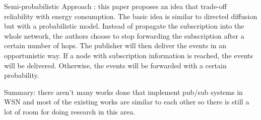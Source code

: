Semi-probabilistic Approach \cite{sp}: this paper proposes an idea that trade-off reliability with energy consumption. The basic idea is similar to directed diffusion but with a probabilistic model. Instead of propagate the subscription into the whole network, the authors choose to stop forwarding the subscription after a certain number of hops. The publisher will then deliver the events in an opportunistic way. If a node with subscription information is reached, the events will be delivered. Otherwise, the events will be forwarded with a certain probability.

Summary: there aren't many works done that implement pub/sub systems in WSN and most of the existing works are similar to each other so there is still a lot of room for doing research in this area.

